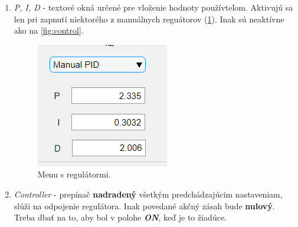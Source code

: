 \begin{enumerate}
 	\item \textit{P, I, D} - textové okná určené pre vloženie hodnoty používteľom. Aktivujú sa len pri zapnutí niektorého z manuálnych reguátorov (\cref{fig:manualPID}). Inak sú neaktívne ako na \cref{fig:control}.
 	 \begin{figure}[h!]
 		\centering
 		\includegraphics[width=0.6\linewidth]{manualPID}
 		\caption{Menu s regulátormi.}
 		\label{fig:manualPID}
 	\end{figure}
 
    \item \textit{Controller} - prepínač \textbf{nadradený} všetkým predchádzajúcim nastaveniam, slúži na odpojenie regulátora. Inak povedané akčný zásah bude \textbf{nulový}. Treba dbať na to, aby bol v polohe \textbf{\textit{ON}}, keď je to žiadúce.
 

 \end{enumerate} 

